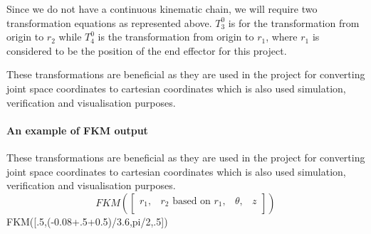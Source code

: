 \documentclass{UoNMCHA}
\numberwithin{equation}{section}
\begin{document}
	Since we do not have a continuous kinematic chain, we will require two transformation equations as represented above. $T_3^0$ is for the transformation from origin to $r_2$ while $T_4^0$ is the transformation from origin to $r_1$, where $r_1$ is considered to be the position of the end effector for this project. \par
	These transformations are beneficial as they are used in the project for converting joint space coordinates to cartesian coordinates which is also used simulation, verification and visualisation purposes.
	
	\paragraph{An example of FKM output}
	
	These transformations are beneficial as they are used in the project for converting joint space coordinates to cartesian coordinates which is also used simulation, verification and visualisation purposes.  \\
	
	\begin{equation*}
	FKM (\begin{bmatrix}
	r_1 ,& r_2 \text{ based on }r_1 , & \theta , & z \\
	\end{bmatrix} )
	\end{equation*}
	FKM([.5,(-0.08+.5+0.5)/3.6,pi/2,.5])
	
\end{document}
